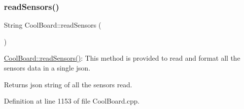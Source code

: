 \subsubsection{\texorpdfstring{read\+Sensors()}{readSensors()}}
{\footnotesize\ttfamily String Cool\+Board\+::read\+Sensors (\begin{DoxyParamCaption}{ }\end{DoxyParamCaption})}

\hyperlink{class_cool_board_ad03abdce2e65f520bbf2cff0f2d083cf}{Cool\+Board\+::read\+Sensors()}\+: This method is provided to read and format all the sensors data in a single json.

\begin{DoxyReturn}{Returns}
json string of all the sensors read. 
\end{DoxyReturn}


Definition at line 1153 of file Cool\+Board.\+cpp.


